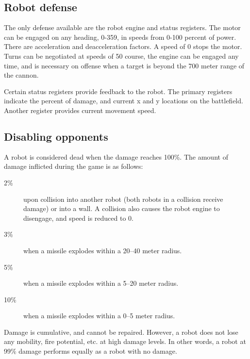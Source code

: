 \documentclass{article}
\begin{document}
\subsection{Robot defense }

        The only defense available are the robot engine and status
        registers.  The motor can be engaged on any heading, 0-359, in
        speeds from 0-100 percent of power.  There are acceleration and
        deacceleration factors.  A speed of 0 stops the motor.  Turns can
        be negotiated at speeds of 50%
        course, the engine can be engaged any time, and is necessary
        on offense when a target is beyond the 700 meter range of the
        cannon.

        Certain status registers provide feedback to the robot. The
        primary registers indicate the percent of damage, and current x
        and y locations on the battlefield.  Another register provides
        current movement speed.


\subsection{Disabling opponents}

        A robot is considered dead when the damage reaches 100\%.  The
        amount of damage inflicted during the game is as follows:

\begin{description}
\item[2\%] upon collision into another robot (both robots in a    
                     collision receive damage) or into a wall.  A
                     collision also causes the robot engine to disengage,
                     and speed is reduced to 0.

\item[3\%] when a missile explodes within a 20--40 meter radius.

\item[5\%] when a missile explodes within a 5--20 meter radius.

\item[10\%] when a missile explodes within a 0--5 meter radius.
\end{description}

        Damage is cumulative, and cannot be repaired.  However, a robot
        does not lose any mobility, fire potential, etc. at high damage
        levels.  In other words, a robot at 99\% damage performs equally
        as a robot with no damage.
\end{document}
